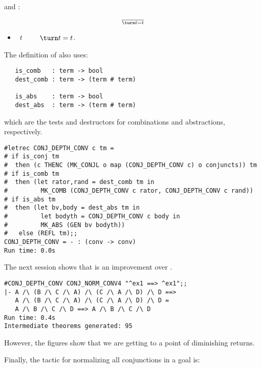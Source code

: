 \noindent and :

$$ \over\turn t = t$$

\begin{itemize}
\item{}~$t$~~\ml{=}~~ $\turn t = t$.
\end{itemize}

\noindent The definition of  also uses:

\begin{hol}\begin{verbatim}
   is_comb   : term -> bool
   dest_comb : term -> (term # term)

   is_abs    : term -> bool
   dest_abs  : term -> (term # term)
\end{verbatim}\end{hol}

\noindent which are the tests and destructors for combinations and
abstractions, respectively.

\begin{session}\begin{verbatim}
#letrec CONJ_DEPTH_CONV c tm =
# if is_conj tm
#  then (c THENC (MK_CONJL o map (CONJ_DEPTH_CONV c) o conjuncts)) tm
# if is_comb tm
#  then (let rator,rand = dest_comb tm in
#         MK_COMB (CONJ_DEPTH_CONV c rator, CONJ_DEPTH_CONV c rand))
# if is_abs tm
#  then (let bv,body = dest_abs tm in
#         let bodyth = CONJ_DEPTH_CONV c body in
#         MK_ABS (GEN bv bodyth))
#   else (REFL tm);;
CONJ_DEPTH_CONV = - : (conv -> conv)
Run time: 0.0s
\end{verbatim}\end{session}

\noindent The next session shows that  is an
improvement over .

\begin{session}\begin{verbatim}
#CONJ_DEPTH_CONV CONJ_NORM_CONV4 "^ex1 ==> ^ex1";;
|- A /\ (B /\ C /\ A) /\ (C /\ A /\ D) /\ D ==>
   A /\ (B /\ C /\ A) /\ (C /\ A /\ D) /\ D =
   A /\ B /\ C /\ D ==> A /\ B /\ C /\ D
Run time: 0.4s
Intermediate theorems generated: 95
\end{verbatim}\end{session}

\noindent However, the figures show that we are getting to a point of
diminishing returns.

Finally, the tactic for normalizing all conjunctions in a goal is:


